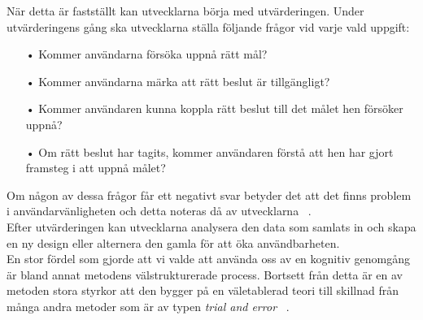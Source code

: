 \documentclass[a4paper, 11pt]{article}
\begin{document}
När detta är fastställt kan utvecklarna börja med utvärderingen. Under utvärderingens gång ska utvecklarna ställa följande frågor vid varje vald uppgift:
\begin{enumerate}
\item[•] Kommer användarna försöka uppnå rätt mål?
\item[•] Kommer användarna märka att rätt beslut är tillgängligt?
\item[•] Kommer användaren kunna koppla rätt beslut till det målet hen försöker uppnå?
\item[•] Om rätt beslut har tagits, kommer användaren förstå att hen har gjort framsteg i att uppnå målet?
\end{enumerate}
Om någon av dessa frågor får ett negativt svar betyder det att det finns problem i användarvänligheten och detta noteras då av utvecklarna ~\cite[sid 230--232]{benyon2010designing}.\\

Efter utvärderingen kan utvecklarna analysera den data som samlats in och skapa en ny design eller alternera den gamla för att öka användbarheten.\\ 

En stor fördel som gjorde att vi valde att använda oss av en kognitiv genomgång är bland annat metodens välstrukturerade process. Bortsett från detta är en av metoden stora styrkor att den bygger på en väletablerad teori till skillnad från många andra metoder som är av typen \textit{trial and error} ~\cite[sid 230-231]{benyon2010designing}.\\
\end{document}
